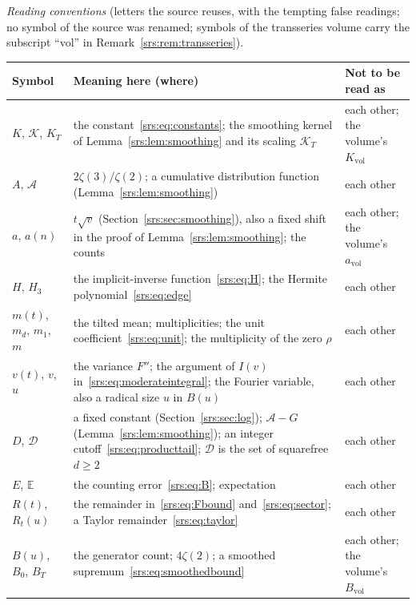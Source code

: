 \documentclass[11pt]{article}
\numberwithin{equation}{section}
\theoremstyle{remark}\newtheorem{remark}[theorem]{Remark}
\newcommand{\E}{\mathbb E}
\begin{document}
\medskip\noindent\begin{minipage}{\textwidth}
\emph{Reading conventions} (letters the source reuses, with the tempting
false readings; no symbol of the source was renamed; symbols of the
transseries volume carry the subscript ``vol'' in
Remark~\ref{srs:rem:transseries}).\par
\smallskip
\begingroup\small\renewcommand{\arraystretch}{1.1}
\noindent\begin{tabular}{@{}>{\raggedright\arraybackslash}p{0.95in}>{\raggedright\arraybackslash}p{3.35in}>{\raggedright\arraybackslash}p{1.8in}@{}}
\toprule
Symbol & Meaning here (where) & Not to be read as\\
\midrule
$K$, $\mathcal K$, $K_T$ & the constant~\eqref{srs:eq:constants}; the smoothing kernel of Lemma~\ref{srs:lem:smoothing} and its scaling $\mathcal K_T$ & each other; the volume's $K_{\mathrm{vol}}$\\
$A$, $\mathcal A$ & $2\zeta(3)/\zeta(2)$; a cumulative distribution function (Lemma~\ref{srs:lem:smoothing}) & each other\\
$a$, $a(n)$ & $t\sqrt v$ (Section~\ref{srs:sec:smoothing}), also a fixed shift in the proof of Lemma~\ref{srs:lem:smoothing}; the counts & each other; the volume's $a_{\mathrm{vol}}$\\
$H$, $H_3$ & the implicit-inverse function~\eqref{srs:eq:H}; the Hermite polynomial~\eqref{srs:eq:edge} & each other\\
$m(t)$, $m_d$, $m_1$, $m$ & the tilted mean; multiplicities; the unit coefficient~\eqref{srs:eq:unit}; the multiplicity of the zero $\rho$ & each other\\
$v(t)$, $v$, $u$ & the variance $F''$; the argument of $I(v)$ in~\eqref{srs:eq:moderateintegral}; the Fourier variable, also a radical size $u$ in $B(u)$ & each other\\
$D$, $\mathcal D$ & a fixed constant (Section~\ref{srs:sec:log}); $\mathcal A-G$ (Lemma~\ref{srs:lem:smoothing}); an integer cutoff~\eqref{srs:eq:producttail}; $\mathcal D$ is the set of squarefree $d\ge2$ & each other\\
$E$, $\E$ & the counting error~\eqref{srs:eq:B}; expectation & each other\\
$R(t)$, $R_t(u)$ & the remainder in~\eqref{srs:eq:Fbound} and~\eqref{srs:eq:sector}; a Taylor remainder~\eqref{srs:eq:taylor} & each other\\
$B(u)$, $B_0$, $B_T$ & the generator count; $4\zeta(2)$; a smoothed supremum~\eqref{srs:eq:smoothedbound} & each other; the volume's $B_{\mathrm{vol}}$\\

\end{tabular}
\end{minipage}
\end{document}
